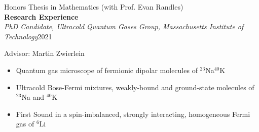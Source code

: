 \documentclass[10pt]{article}
\begin{document}
Honors Thesis in Mathematics (with Prof. Evan Randles)\\

	







\noindent \large{\textbf{{Research Experience}}}   \normalsize \\  

\vspace{-5pt}
\noindent \textit{PhD Candidate, Ultracold Quantum Gases Group, Massachusetts Institute of Technology}\hfill 2021\textendash

\vspace{2pt}
Advisor: Martin Zwierlein 
\vspace{-5pt}
\begin{itemize}
	\setlength\itemsep{-4pt}
	\item Quantum gas microscope of fermionic dipolar molecules of $^{23}$Na$^{40}$K
	\item Ultracold Bose-Fermi mixtures, weakly-bound and ground-state molecules of $^{23}$Na and $^{40}$K
	\item First Sound in a spin-imbalanced, strongly interacting, homogeneous Fermi gas of $^{6}$Li
\end{itemize}
\end{document}
